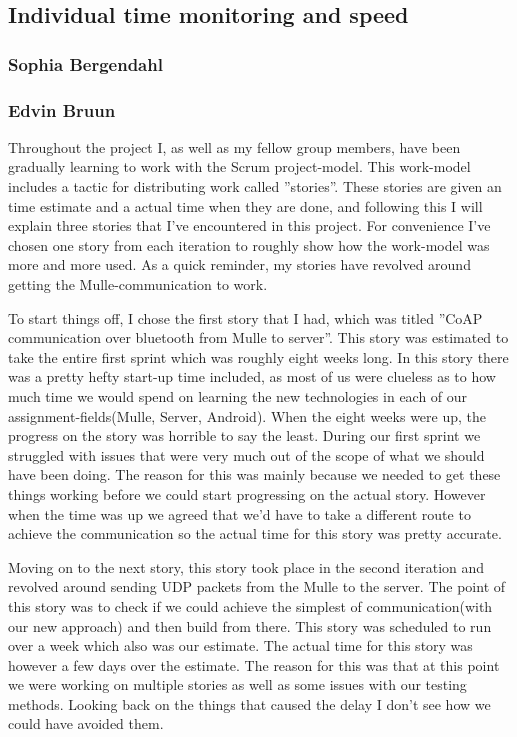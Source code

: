 \subsection{Individual time monitoring and speed}
\subsubsection{Sophia Bergendahl}
\newpage
\subsubsection{Edvin Bruun}
Throughout the project I, as well as my fellow group members, have been gradually learning to work with the Scrum project-model.
This work-model includes a tactic for distributing work called ''stories''. These stories are given an time estimate and a actual time when they are done, 
and following this I will explain three stories that I've encountered in this project. 
For convenience I've chosen one story from each iteration to roughly show how the work-model was more and more used. As a quick reminder, my stories have revolved around getting the Mulle-communication to work.

To start things off, I chose the first story that I had, which was titled ''CoAP communication over bluetooth from Mulle to server''.
This story was estimated to take the entire first sprint which was roughly eight weeks long. In this story there was a pretty hefty start-up time included, 
as most of us were clueless as to how much time we would spend on learning the new technologies in each of our assignment-fields(Mulle, Server, Android).
When the eight weeks were up, the progress on the story was horrible to say the least. During our first sprint we struggled with issues that were very much 
out of the scope of what we should have been doing. The reason for this was mainly because we needed to get these things working before we could start progressing on the actual story.
However when the time was up we agreed that we'd have to take a different route to achieve the communication so the actual time for this story was pretty accurate.

Moving on to the next story, this story took place in the second iteration and revolved around sending UDP packets from the Mulle to the server.
The point of this story was to check if we could achieve the simplest of communication(with our new approach) and then build from there. This story was scheduled to run over 
a week  which also was our estimate. The actual time for this story was however a few days over the estimate. The reason for this was that at this point we were working on multiple stories as
well as some issues with our testing methods. Looking back on the things that caused the delay I don't see how we could have avoided them.


